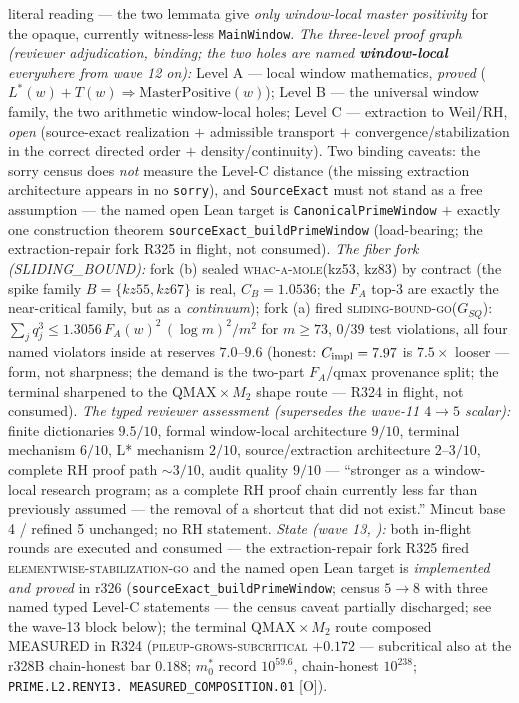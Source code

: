 \documentclass[11pt,a4paper]{article}
\begin{document}
{literal reading --- the two lemmata give \emph{only window-local
master positivity} for the opaque, currently witness-less
\texttt{MainWindow}.  \emph{The three-level proof graph (reviewer
adjudication, binding; the two holes are named
\textbf{window-local} everywhere from wave 12 on):} Level A ---
local window mathematics, \emph{proved} ($L^*(w) + T(w)
\Rightarrow \mathrm{MasterPositive}(w)$); Level B --- the
universal window family, the two arithmetic window-local holes;
Level C --- extraction to Weil/RH, \emph{open} (source-exact
realization $+$ admissible transport $+$
convergence/stabilization in the correct directed order $+$
density/continuity).  Two binding caveats: the sorry census does
\emph{not} measure the Level-C distance (the missing extraction
architecture appears in no \texttt{sorry}), and
\texttt{SourceExact} must not stand as a free assumption --- the
named open Lean target is \texttt{CanonicalPrimeWindow} $+$
exactly one construction theorem
\texttt{sourceExact\_buildPrimeWindow} (load-bearing; the
extraction-repair fork R325 in flight, not consumed).  \emph{The
fiber fork (SLIDING\_BOUND):} fork (b) sealed
\textsc{whac-a-mole}(kz53, kz83) by contract (the spike family
$B = \{kz55, kz67\}$ is real, $C_B = 1.0536$; the $F_A$ top-3 are
exactly the near-critical family, but as a \emph{continuum});
fork (a) fired \textsc{sliding-bound-go}($G_{SQ}$): $\sum_j q_j^3
\le 1.3056\,F_A(w)^2\,(\log m)^2/m^2$ for $m \ge 73$, $0/39$ test
violations, all four named violators inside at reserves
$7.0$--$9.6$ (honest: $C_{\rm impl} = 7.97$ is $7.5\times$ looser
--- form, not sharpness; the demand is the two-part $F_A$/qmax
provenance split; the terminal sharpened to the
QMAX${}\times M_2$ shape route --- R324 in flight, not consumed).
\emph{The typed reviewer assessment (supersedes the wave-11
$4 \to 5$ scalar):} finite dictionaries $9.5/10$, formal
window-local architecture $9/10$, terminal mechanism $6/10$, L*
mechanism $2/10$, source/extraction architecture $2$--$3/10$,
complete RH proof path $\sim 3/10$, audit quality $9/10$ ---
``stronger as a window-local research program; as a complete RH
proof chain currently less far than previously assumed --- the
removal of a shortcut that did not exist.''  Mincut base 4 /
refined 5 unchanged; no RH statement.  \emph{State (wave 13,
):} both in-flight
rounds are executed and consumed --- the extraction-repair fork
R325 fired \textsc{elementwise-stabilization-go} and the named
open Lean target is \emph{implemented and proved} in r326
(\texttt{sourceExact\_buildPrimeWindow}; census $5 \to 8$ with
three named typed Level-C statements --- the census caveat
partially discharged; see the wave-13 block below); the terminal
QMAX${}\times M_2$ route composed MEASURED in R324
(\textsc{pileup-grows-subcritical} $+0.172$ --- subcritical also
at the r328B chain-honest bar $0.188$; $m_0^*$ record $10^{59.6}$,
chain-honest $10^{238}$;
\texttt{PRIME.L2.\allowbreak RENYI3.\allowbreak
MEASURED\_COMPOSITION.01} [O]).\par}
\end{document}

